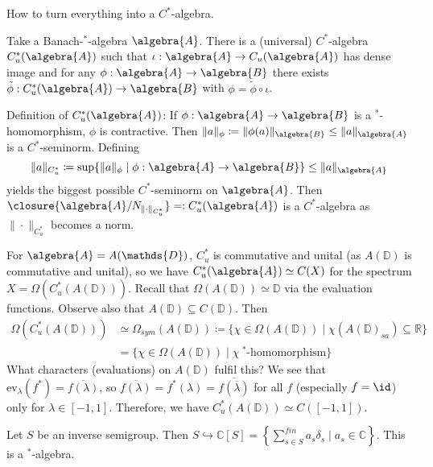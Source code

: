 \documentclass[a4paper]{article}
\begin{document}
\begin{remark}
	How to turn everything into a $C^*$-algebra.

	Take a Banach-$^*$-algebra $\algebra{A}$.
	There is a (universal) $C^*$-algebra $C_u^*(\algebra{A})$ such that 
	$\iota: \algebra{A} \to C_u(\algebra{A})$ has dense image and for any $\phi: \algebra{A} \to \algebra{B}$ there exists $\tilde{\phi}: C_u^*(\algebra{A}) \to \algebra{B}$ with $\phi = \tilde{\phi} \circ \iota$.

	Definition of $C_u^*(\algebra{A})$: If $\phi: \algebra{A} \to \algebra{B}$ is a $^*$-homomorphism, $\phi$ is contractive.
	Then $\|a\|_\phi \coloneqq \|\phi(a)\|_\algebra{B} \leq \|a\|_\algebra{A}$ is a $C^*$-seminorm.
	Defining 
	\begin{equation*}
		\|a\|_{C_u^*} \coloneq \sup \{ \|a\|_\phi \mid \phi: \algebra{A} \to \algebra{B}\} \leq \|a\|_\algebra{A}
	\end{equation*} 
	yields the biggest possible $C^*$-seminorm on $\algebra{A}$.
	Then $\closure{\algebra{A} / N_{\|\cdot\|_{C_u^*}}} =: C_u^*(\algebra{A})$ is a $C^*$-algebra as $\| \cdot \|_{C_u^*}$ becomes a norm.
\end{remark}

\begin{example}
	For $\algebra{A} = A(\mathds{D})$, $C_u^*$ is commutative and unital (as $A(\mathds{D})$ is commutative and unital), so we have $C_u^*(\algebra{A}) \simeq C(X)$ for the spectrum $X = \Omega(C_u^*(A(\mathds{D})))$.
	Recall that $\Omega(A(\mathds{D})) \simeq \mathds{D}$ via the evaluation functions.
	Observe also that $A(\mathds{D}) \subseteq C(\mathds{D})$.
	Then 
	\begin{align*}
		\Omega(C_u^*(A(\mathds{D}))) &\simeq \Omega_{sym}(A(\mathds{D})) \coloneq \{ \chi \in \Omega(A(\mathds{D})) \mid \chi(A(\mathds{D})_{sa}) \subseteq \mathds{R}\}\\
		&= \{ \chi \in \Omega(A(\mathds{D})) \mid \chi \ ^*\text{-homomorphism} \}
	\end{align*}
	What characters (evaluations) on $A(\mathds{D})$ fulfil this? We see that $\mathrm{ev}_\lambda(f^*) = \overline{f(\lambda)}$, so $\overline{f(\lambda)} = f^*(\lambda) = \overline{f(\overline{\lambda})}$ for all $f$ (especially $f = \id$) only for $\lambda \in [-1,1]$.
	Therefore, we have $C_u^*(A(\mathds{D})) \simeq C([-1,1])$.
\end{example}



\begin{example}
	Let $S$ be an inverse semigroup. Then $S \hookrightarrow \mathds{C}[S] = \left\{ \sum_{s \in S}^{fin} a_s \delta_s \mid a_s \in \mathds{C}  \right\}$.
	This is a $^*$-algebra.
\end{example}
\end{document}
